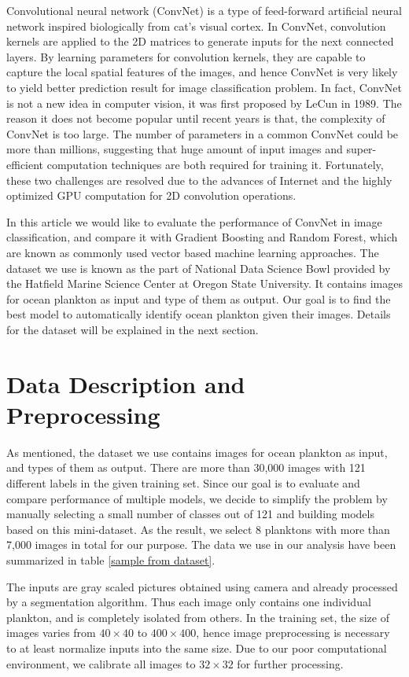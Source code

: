 \documentclass[11pt,oneside,a4paper]{article}
\numberwithin{equation}{section}
\begin{document}
Convolutional neural network (ConvNet) is a type of feed-forward artificial neural network inspired biologically from cat's visual cortex\cite{hubel1968receptive}. In ConvNet, convolution kernels are applied to the 2D matrices to generate inputs for the next connected layers. By learning parameters for convolution kernels, they are capable to capture the local spatial features of the images, and hence ConvNet is very likely to yield better prediction result for image classification problem. In fact, ConvNet is not a new idea in computer vision, it was first proposed by LeCun\cite{lecun1989generalization} in 1989. The reason it does not become popular until recent years is that, the complexity of ConvNet is too large. The number of parameters in a common ConvNet could be more than millions, suggesting that huge amount of input images and super-efficient computation techniques are both required for training it. Fortunately, these two challenges are resolved due to the advances of Internet and the highly optimized GPU computation for 2D convolution operations.

In this article we would like to evaluate the performance of ConvNet in image classification, and compare it with Gradient Boosting and Random Forest, which are known as commonly used vector based machine learning approaches. The dataset we use is known as the part of National Data Science Bowl provided by the Hatfield Marine Science Center at Oregon State University. It contains images for ocean plankton as input and type of them as output. Our goal is to find the best model to automatically identify ocean plankton given their images. Details for the dataset will be explained in the next section.

\section{Data Description and Preprocessing}
As mentioned, the dataset we use contains images for ocean plankton as input, and types of them as output. There are more than 30,000 images with 121 different labels in the given training set. Since our goal is to evaluate and compare performance of multiple models, we decide to simplify the problem by manually selecting a small number of classes out of 121 and building models based on this mini-dataset. As the result, we select 8 planktons with more than 7,000 images in total for our purpose. The data we use in our analysis have been summarized in table \ref{sample from dataset}.

The inputs are gray scaled pictures obtained using camera and already processed by a segmentation algorithm. Thus each image only contains one individual plankton, and is completely isolated from others. In the training set, the size of images varies from $40 \times 40$ to $400 \times 400$, hence image preprocessing is necessary to at least normalize inputs into the same size. Due to our poor computational environment, we calibrate all images to $32 \times 32$ for further processing.
\end{document}
